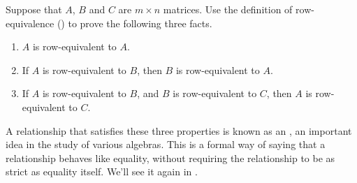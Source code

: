 Suppose that $A$, $B$ and $C$ are $m\times n$ matrices.  Use the definition of row-equivalence () to prove the following three facts.
%
\begin{enumerate}
%
\item $A$ is row-equivalent to $A$.
%
\item If $A$ is row-equivalent to $B$, then $B$ is row-equivalent to $A$.
%
\item If $A$ is row-equivalent to $B$, and $B$ is row-equivalent to $C$, then $A$ is row-equivalent to $C$.
%
\end{enumerate}
%
A relationship that satisfies these three properties is known as an , an important idea in the study of various algebras.  This is a formal way of saying that a relationship behaves like equality, without requiring the relationship to be as strict as equality itself.   We'll see it again in .